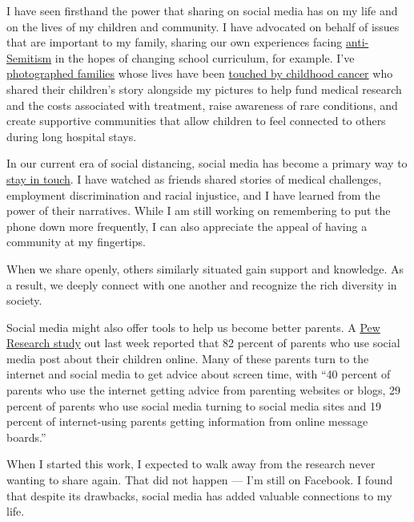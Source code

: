I have seen firsthand the power that sharing on social media has on my
life and on the lives of my children and community. I have advocated on
behalf of issues that are important to my family, sharing our own
experiences facing
\href{https://www.gainesville.com/news/20190507/students-talk-about-anti-semitic-bullying-in-alachua-county-schools}{anti-Semitism}
in the hopes of changing school curriculum, for example. I've
\href{https://www.law.ufl.edu/law-news/law-professors-artistic-turn}{photographed
families} whose lives have been
\href{https://www.washingtonpost.com/news/parenting/wp/2016/09/20/families-of-children-with-cancer-ask-please-dont-look-away-heres-how-you-can-help/}{touched
by childhood cancer} who shared their children's story alongside my
pictures to help fund medical research and the costs associated with
treatment, raise awareness of rare conditions, and create supportive
communities that allow children to feel connected to others during long
hospital stays.

In our current era of social distancing, social media has become a
primary way to
\href{https://www.washingtonpost.com/lifestyle/2020/04/06/this-may-be-time-harness-power-social-media-family/}{stay
in touch}. I have watched as friends shared stories of medical
challenges, employment discrimination and racial injustice, and I have
learned from the power of their narratives. While I am still working on
remembering to put the phone down more frequently, I can also appreciate
the appeal of having a community at my fingertips.

When we share openly, others similar­ly situated gain support and
knowledge. As a result, we deeply connect with one another and recognize
the rich diversity in society.

Social media might also offer tools to help us become better parents. A
\href{https://www.pewresearch.org/internet/2020/07/28/parents-attitudes-and-experiences-related-to-digital-technology/}{Pew
Research study} out last week reported that 82 percent of parents who
use social media post about their children online. Many of these parents
turn to the internet and social media to get advice about screen time,
with ``40 percent of parents who use the internet getting advice from
parenting websites or blogs, 29 percent of parents who use social media
turning to social media sites and 19 percent of internet-using parents
getting information from online message boards.''

When I started this work, I expected to walk away from the research
never wanting to share again. That did not happen --- I'm still on
Facebook. I found that despite its drawbacks, social media has added
valuable connections to my life.

